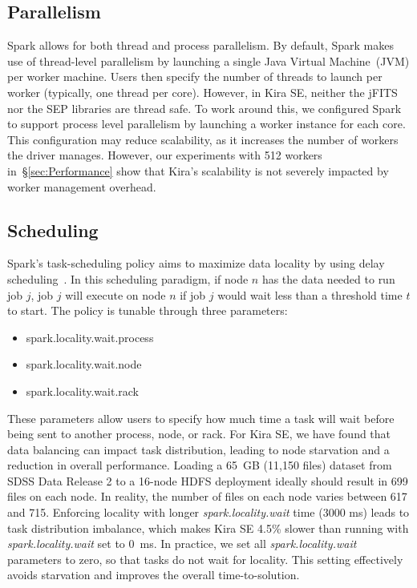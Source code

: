 \documentclass[conference]{IEEEtran}
\begin{document}
\subsection{Parallelism}

Spark allows for both thread and process parallelism. By default, Spark makes use of
thread-level parallelism by launching a single Java Virtual Machine~(JVM) per worker machine.
Users then specify the number of threads to launch per worker (typically, one thread per core).
However, in Kira SE, neither the jFITS nor the SEP libraries are thread safe. 
To work around this,
we configured Spark to support process level parallelism by launching a worker instance for each
core. This configuration may reduce scalability,
as it increases the number of workers the driver manages. However, our experiments with 512
workers in~\S\ref{sec:Performance} show that Kira's scalability is not severely impacted by
worker management overhead.

\subsection{Scheduling}

Spark's task-scheduling policy aims to maximize data locality by using
delay scheduling~\cite{zaharia10ds}. In this scheduling paradigm, if node $n$ has the data needed
to run job $j$, job $j$ will execute on node $n$ if job $j$ would wait less than a threshold time
$t$ to start. The policy is tunable through three parameters:

\begin{itemize}
\item{spark.locality.wait.process}
\item{spark.locality.wait.node}
\item{spark.locality.wait.rack}
\end{itemize}

These parameters allow users to specify how much time a task will wait before being sent to another
process, node, or rack. For Kira SE, we have found that data balancing can 
impact task distribution, leading to node starvation and a reduction in overall performance.
Loading a 65~GB (11,150 files) dataset from SDSS Data Release 2 to a 16-node HDFS deployment ideally should result in 699 files on each node.
In reality, the number of files on each node varies between 617 and 715.
Enforcing locality with longer {\em spark.locality.wait} time (3000 ms) leads to task distribution imbalance, which makes
Kira SE 4.5\% slower than running with {\em spark.locality.wait} set to 0~ms.
In practice, we set all {\em spark.locality.wait} parameters to zero, so that tasks do not wait for locality.
This setting effectively avoids starvation and improves the overall time-to-solution.
\end{document}
